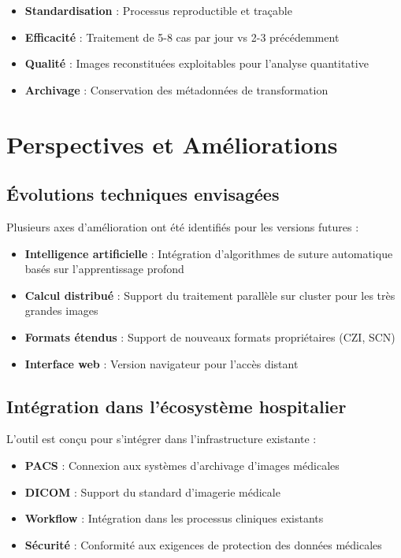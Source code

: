 \documentclass[12pt,a4paper]{report}
\begin{document}
\begin{itemize}
    \item \textbf{Standardisation} : Processus reproductible et traçable
    \item \textbf{Efficacité} : Traitement de 5-8 cas par jour vs 2-3 précédemment
    \item \textbf{Qualité} : Images reconstituées exploitables pour l'analyse quantitative
    \item \textbf{Archivage} : Conservation des métadonnées de transformation
\end{itemize}

\section{Perspectives et Améliorations}

\subsection{Évolutions techniques envisagées}

Plusieurs axes d'amélioration ont été identifiés pour les versions futures :

\begin{itemize}
    \item \textbf{Intelligence artificielle} : Intégration d'algorithmes de suture automatique basés sur l'apprentissage profond
    \item \textbf{Calcul distribué} : Support du traitement parallèle sur cluster pour les très grandes images
    \item \textbf{Formats étendus} : Support de nouveaux formats propriétaires (CZI, SCN)
    \item \textbf{Interface web} : Version navigateur pour l'accès distant
\end{itemize}

\subsection{Intégration dans l'écosystème hospitalier}

L'outil est conçu pour s'intégrer dans l'infrastructure existante :

\begin{itemize}
    \item \textbf{PACS} : Connexion aux systèmes d'archivage d'images médicales
    \item \textbf{DICOM} : Support du standard d'imagerie médicale
    \item \textbf{Workflow} : Intégration dans les processus cliniques existants
    \item \textbf{Sécurité} : Conformité aux exigences de protection des données médicales
\end{itemize}
\end{document}
